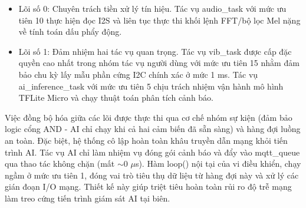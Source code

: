 \begin{itemize}
    \item Lõi số 0: Chuyên trách tiền xử lý tín hiệu. Tác vụ audio\_task với mức ưu tiên 10 thực hiện đọc I2S và liên tục thực thi khối lệnh FFT/bộ lọc Mel nặng về tính toán dấu phẩy động.
    \item Lõi số 1: Đảm nhiệm hai tác vụ quan trọng. Tác vụ vib\_task được cấp đặc quyền cao nhất trong nhóm tác vụ người dùng với mức ưu tiên 15 nhằm đảm bảo chu kỳ lấy mẫu phần cứng I2C chính xác ở mức 1 ms. Tác vụ ai\_inference\_task với mức ưu tiên 5 chịu trách nhiệm vận hành mô hình TFLite Micro và chạy thuật toán phân tích cảnh báo.
\end{itemize}

Việc đồng bộ hóa giữa các lõi được thực thi qua cơ chế nhóm sự kiện (đảm bảo logic cổng AND - AI chỉ chạy khi cả hai cảm biến đã sẵn sàng) và hàng đợi luồng an toàn. Đặc biệt, hệ thống cô lập hoàn toàn khâu truyền dẫn mạng khỏi tiến trình AI. Tác vụ AI chỉ làm nhiệm vụ đóng gói cảnh báo và đẩy vào mqtt\_queue qua thao tác không chặn (mất $\sim$0 $\mu$s). Hàm loop() nội tại của vi điều khiển, chạy ngầm ở mức ưu tiên 1, đóng vai trò tiêu thụ dữ liệu từ hàng đợi này và xử lý các gián đoạn I/O mạng. Thiết kế này giúp triệt tiêu hoàn toàn rủi ro độ trễ mạng làm treo cứng tiến trình giám sát AI tại biên.

